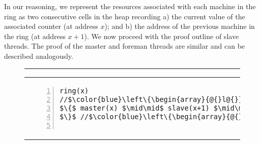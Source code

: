 In our reasoning, we represent the resources associated with each machine in the ring as two consecutive cells in the heap recording a) the current value of the associated counter (at address $x$); and b) the address of the previous machine in the ring (at address $x+1$). 
We now proceed with the proof outline of slave threads. The proof of the master and foreman threads are similar and can be described analogously. 
%
\begin{figure}
\centering
\noindent\hrule\vspace{10pt}
\vspace{-3ex}
\begin{tabular}{@{} l @{\hspace{4ex}} l@{}}
{\begin{lstlisting}[numbers=left,numbersep=5pt]
ring(x)
//$\color{blue}\left\{\begin{array}{@{}l@{}}\tx{x}|-< x * [\token m_{x,2}] * [\token s_{x{+}1}] * [\token s_{x{+}2}]*\null\\ \shared{\begin{array}{@{}l@{}}\tx{n}|-<n * x|->0 * x{+}1|->0 * x{+}2|->0\end{array}}{I}\end{array} \right\}$
$\{$ master(x) $\mid\mid$ slave(x+1) $\mid\mid$ slave(x+2);
$\}$ //$\color{blue}\left\{\begin{array}{@{}l@{}}\tx{x}|-< x * [\token m_{x,2}] * [\token s_{x{+}1}] * [\token s_{x{+}2}]*\null\\ \shared{\begin{array}{@{}l@{}}\tx{n}|-<n * x|->10 * x{+}1|->10 * x{+}2|->10\end{array}}{I}\end{array} \right\}$


\end{lstlisting}}
\end{tabular}
\end{figure}
